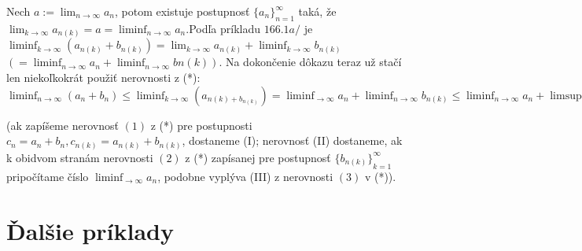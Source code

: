 Nech $a:=\lim_{n \rightarrow \infty} a_n$, potom existuje postupnosť ${\{a_n\}}_{n=1}^\infty$ taká, že $\lim_{k \rightarrow \infty} a_{n(k)}=a=\liminf_{n \rightarrow \infty} a_n$.Podľa príkladu $166.1a/$ je $\liminf_{k \rightarrow \infty} (a_{n(k)}+b_{n(k)})=\lim_{k \rightarrow \infty} a_{n(k)}+\liminf_{k \rightarrow \infty} b_{n(k)}$  $(=\liminf_{n \rightarrow \infty} a_n + \liminf_{n \rightarrow \infty} b{n(k)}).$ Na dokončenie dôkazu teraz už stačí len niekoľkokrát použiť nerovnosti z (*):
$\liminf_{n \rightarrow \infty} (a_n+b_n) \leq \liminf_{k \rightarrow \infty} (a_{n(k)+b_{n(k)}})=\liminf_{\rightarrow \infty} a_n+\liminf_{n \rightarrow \infty} b_{n(k)} \leq \liminf_{n \rightarrow \infty} a_n+\limsup_{k \rightarrow \infty} b_{n(k)}\leq \liminf_{n \rightarrow \infty} a_n+\limsup_{n \rightarrow \infty} b_n$

(ak zapíšeme nerovnosť $(1)$ z (*) pre postupnosti $c_n=a_n+b_n,c_{n(k)}=a_{n(k)}+b_{n(k)}$, dostaneme (I); nerovnosť (II) dostaneme, ak k obidvom stranám nerovnosti $(2)$ z (*) zapísanej pre postupnosť ${\{b_{n(k)}\}}_{k=1}^\infty$ pripočítame číslo $\liminf_{\rightarrow \infty} a_n$, podobne vyplýva (III) z nerovnosti $(3)$ v (*)).

\section{Ďalšie príklady}